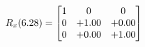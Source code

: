 \documentclass[preview]{standalone}
\begin{document}
\begin{align*}
\special{dvisvgm:raw <g id='unique000'>}R_{x}(6.28) = \begin{bmatrix}1 & 0 & 0 \\0 & +1.00 & +0.00 \\0 & +0.00 & +1.00\end{bmatrix}\special{dvisvgm:raw </g>}
\end{align*}
\end{document}
